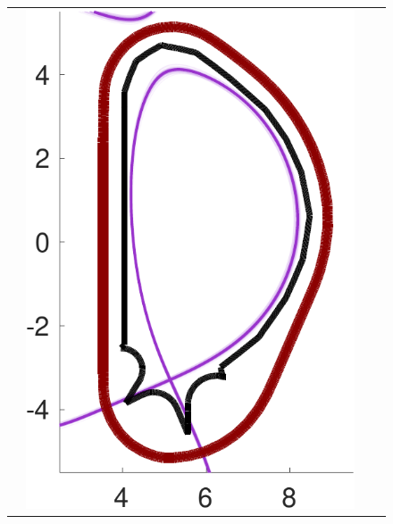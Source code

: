 \documentclass{beamer}
\begin{document}
\begin{frame}[t]
\begin{itemize}[leftmargin=5pt]
\begin{figure}[ht!]
{\begin{tabular}{cccc}
&\includegraphics[width=1\linewidth]{QoI_MC_surrogate.pdf}

\end{tabular}}
\end{figure}
\end{itemize}
\end{frame}
\end{document}
